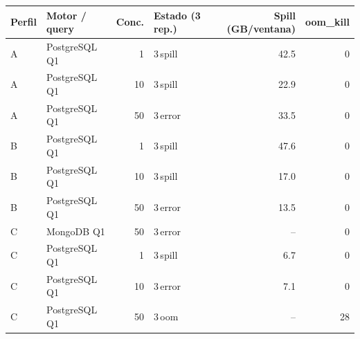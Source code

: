 \begin{tabular}{llrlrr}
\toprule
Perfil & Motor / query & Conc. & Estado (3 rep.) & Spill (GB/ventana) & oom\_kill \\
\midrule
A & PostgreSQL Q1 & 1 & 3\,spill & 42.5 & 0 \\
A & PostgreSQL Q1 & 10 & 3\,spill & 22.9 & 0 \\
A & PostgreSQL Q1 & 50 & 3\,error & 33.5 & 0 \\
B & PostgreSQL Q1 & 1 & 3\,spill & 47.6 & 0 \\
B & PostgreSQL Q1 & 10 & 3\,spill & 17.0 & 0 \\
B & PostgreSQL Q1 & 50 & 3\,error & 13.5 & 0 \\
C & MongoDB Q1 & 50 & 3\,error & -- & 0 \\
C & PostgreSQL Q1 & 1 & 3\,spill & 6.7 & 0 \\
C & PostgreSQL Q1 & 10 & 3\,error & 7.1 & 0 \\
C & PostgreSQL Q1 & 50 & 3\,oom & -- & 28 \\
\bottomrule
\end{tabular}
